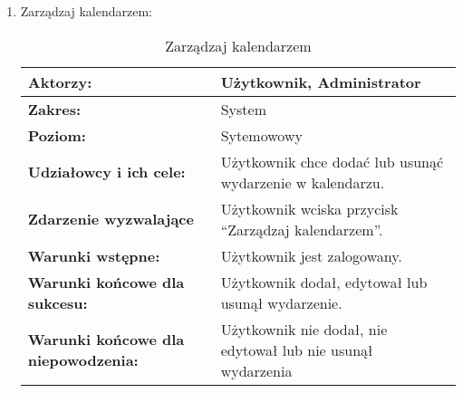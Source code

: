 \begin{enumerate}[label=(\Roman*)]
	\item Zarządzaj kalendarzem:
	\begin{table}[h]
\centering
\caption{Zarządzaj kalendarzem}
\label{zarzadzajkalendarzem}
\begin{tabular}{|p{7cm}|p{7cm}|}
  \hline 
  \textbf{Aktorzy:} & Użytkownik, Administrator\\
  \hline
  \textbf{Zakres:} & System \\
	\hline
  \textbf{Poziom:} & Sytemowowy \\
	\hline
  \textbf{Udziałowcy i ich cele: } & Użytkownik chce dodać lub usunąć wydarzenie w kalendarzu. \\
	\hline
  \textbf{Zdarzenie wyzwalające } & Użytkownik wciska przycisk “Zarządzaj kalendarzem”. \\
	\hline
  \textbf{Warunki wstępne: } & Użytkownik jest zalogowany.
 \\
	\hline
  \textbf{Warunki końcowe dla sukcesu:} & Użytkownik dodał, edytował lub usunął wydarzenie.
 \\
	\hline
  \textbf{Warunki końcowe dla niepowodzenia:} & Użytkownik nie dodał, nie edytował lub nie usunął wydarzenia \\
  \hline
\end{tabular} 
\end{table}


\end{enumerate}
